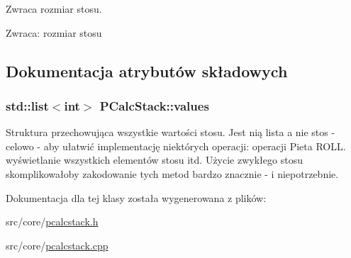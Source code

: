 Zwraca rozmiar stosu. \begin{Desc}
\item[Zwraca:]rozmiar stosu \end{Desc}


\subsection{Dokumentacja atrybutów składowych}
\hypertarget{classPCalcStack_4777b5f859158a71a18deb0bc0978653}{
\subsubsection[{values}]{\setlength{\rightskip}{0pt plus 5cm}std::list$<$int$>$ {\bf PCalcStack::values}}}
\label{classPCalcStack_4777b5f859158a71a18deb0bc0978653}


Struktura przechowująca wszystkie wartości stosu. Jest nią lista a nie stos - celowo - aby ułatwić implementację niektórych operacji: operacji Pieta ROLL. wyświetlanie wszystkich elementów stosu itd. Użycie zwykłego stosu skomplikowałoby zakodowanie tych metod bardzo znacznie - i niepotrzebnie. 

Dokumentacja dla tej klasy została wygenerowana z plików:\begin{CompactItemize}
\item 
src/core/\hyperlink{pcalcstack_8h}{pcalcstack.h}\item 
src/core/\hyperlink{pcalcstack_8cpp}{pcalcstack.cpp}\end{CompactItemize}
